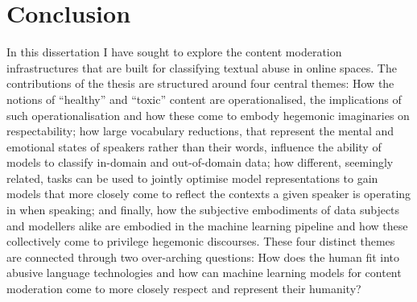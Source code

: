\ifpdf
    \graphicspath{{Chapter8/Figs/Raster/}{Chapter8/Figs/PDF/}{Chapter8/Figs/}}
\else
    \graphicspath{{Chapter8/Figs/Vector/}{Chapter8/Figs/}}
\fi

\chapter{Conclusion}\label{chap:conclusion}

In this dissertation I have sought to explore the content moderation infrastructures that are built for classifying textual abuse in online spaces.
The contributions of the thesis are structured around four central themes:
How the notions of ``healthy'' and ``toxic'' content are operationalised, the implications of such operationalisation and how these come to embody hegemonic imaginaries on respectability;
how large vocabulary reductions, that represent the mental and emotional states of speakers rather than their words, influence the ability of models to classify in-domain and out-of-domain data;
how different, seemingly related, tasks can be used to jointly optimise model representations to gain models that more closely come to reflect the contexts a given speaker is operating in when speaking;
and finally, how the subjective embodiments of data subjects and modellers alike are embodied in the machine learning pipeline and how these collectively come to privilege hegemonic discourses.
These four distinct themes are connected through two over-arching questions: How does the human fit into abusive language technologies and how can machine learning models for content moderation come to more closely respect and represent their humanity?

